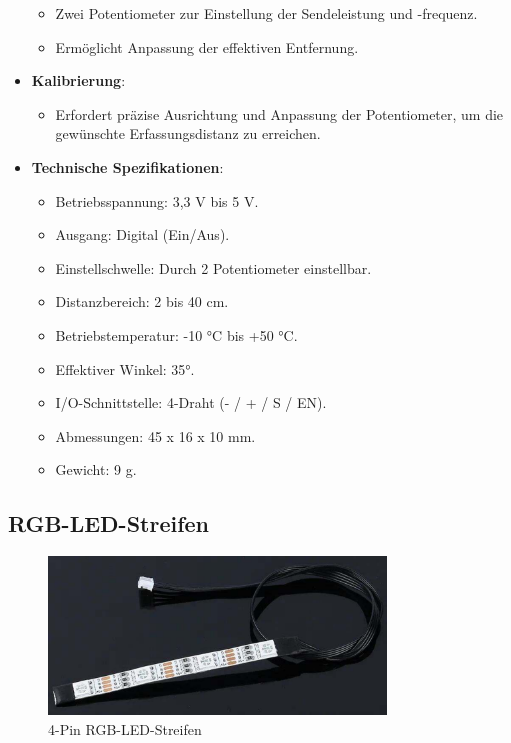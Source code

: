 \documentclass{vorlage-design-main}
\begin{document}
\begin{itemize}
\begin{itemize}
  \item
    Zwei Potentiometer zur Einstellung der Sendeleistung und -frequenz.
  \item
    Ermöglicht Anpassung der effektiven Entfernung.
  \end{itemize}
\item
  \textbf{Kalibrierung}:

  \begin{itemize}
  
  \item
    Erfordert präzise Ausrichtung und Anpassung der Potentiometer, um
    die gewünschte Erfassungsdistanz zu erreichen.
  \end{itemize}
\item
  \textbf{Technische Spezifikationen}:

  \begin{itemize}
  
  \item
    Betriebsspannung: 3,3 V bis 5 V.
  \item
    Ausgang: Digital (Ein/Aus).
  \item
    Einstellschwelle: Durch 2 Potentiometer einstellbar.
  \item
    Distanzbereich: 2 bis 40 cm.
  \item
    Betriebstemperatur: -10 °C bis +50 °C.
  \item
    Effektiver Winkel: 35°.
  \item
    I/O-Schnittstelle: 4-Draht (- / + / S / EN).
  \item
    Abmessungen: 45 x 16 x 10 mm.
  \item
    Gewicht: 9 g.
  \end{itemize}
\end{itemize}

\hypertarget{rgb-led-streifen}{%
\subsection{RGB-LED-Streifen}\label{rgb-led-streifen}}

\begin{figure}
\centering
\includegraphics[width=0.8\textwidth]{images/4_rgb_strip.pdf}
\floatnotes{}
\caption{4-Pin RGB-LED-Streifen}
\end{figure}
\end{document}
